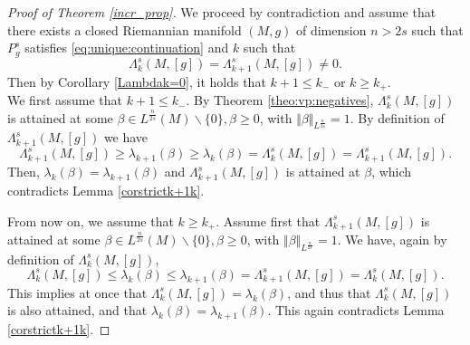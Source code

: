 \documentclass[10pt]{amsart}
\numberwithin{equation}{section}
\def\la{{\lambda}}
\theoremstyle{plain}
\theoremstyle{remark}
\begin{document}
\begin{proof} [Proof of Theorem \ref{incr_prop}]
We proceed by contradiction and assume that there exists a closed Riemannian manifold $(M,g)$ of dimension $n >2s$ such that $P_g^s$ satisfies \eqref{eq:unique:continuation} and $k$ such that 
\begin{equation}\label{incr_prop:0}
\Lambda^s_k(M,[g])=\Lambda^s_{k+1}(M,[g])\not=0.
\end{equation} 
Then by Corollary \ref{Lambdak=0}, it holds that $k+1 \leq k_-$ or $k \geq k_+$. \\ 

We first assume that $k+1 \leq k_-$. By Theorem \ref{theo:vp:negatives}, $\Lambda_{k}^s(M,[g])$ is attained at some $\beta \in L^{\frac{n}{2s}}(M) \backslash \{0\}, \beta \ge 0$, with $\Vert \beta \Vert_{L^{\frac{n}{2s}}}=1$. By definition of $\Lambda^s_{k+1}(M,[g])$ we have
$$\Lambda^s_{k+1}(M,[g]) \geq \la_{k+1}(\beta) \geq \la_{k}(\beta)=\Lambda^s_{k}(M,[g])=\Lambda^s_{k+1}(M,[g]). $$ 
Then, $\la_{k}(\beta) =\la_{k+1}(\beta)$ and $\Lambda^s_{k+1}(M,[g])$ is attained at $\beta$, which contradicts Lemma \ref{corstrictk+1k}. 

From now on, we assume that $k\geq k_+$. Assume first that $\Lambda_{k+1}^s(M,[g])$ is attained at some $\beta \in L^{\frac{n}{2s}}(M) \backslash \{0\}, \beta \ge 0$, with $\Vert \beta \Vert_{L^{\frac{n}{2s}}}=1$. We have, again by definition of $\Lambda^s_{k}(M,[g])$,
\begin{equation} \label{incr_prop:1}
\Lambda^s_{k}(M,[g]) \leq \la_{k}(\beta) \leq \la_{k+1}(\beta)=\Lambda^s_{k+1}(M,[g])=\Lambda^s_{k}(M,[g]). 
\end{equation}
This implies at once that $\Lambda^s_{k}(M,[g]) = \la_{k}(\beta)$, and thus that $\Lambda^s_{k}(M,[g])$ is also attained, and that  $\la_{k}(\beta) =\la_{k+1}(\beta)$. This again contradicts Lemma \ref{corstrictk+1k}. 


\end{proof}
\end{document}
